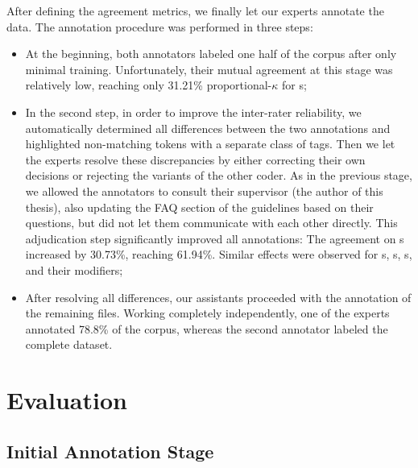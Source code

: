 After defining the agreement metrics, we finally let our experts
annotate the data.  The annotation procedure was performed in three
steps:
\begin{itemize}
  \item At the beginning, both annotators labeled one half of the
    corpus after only minimal training.  Unfortunately, their mutual
    agreement at this stage was relatively low, reaching only 31.21\%
    proportional-$\kappa$ for s;
  \item In the second step, in order to improve the inter-rater
    reliability, we automatically determined all differences between
    the two annotations and highlighted non-matching tokens with a
    separate class of tags.  Then we let the experts resolve these
    discrepancies by either correcting their own decisions or
    rejecting the variants of the other coder.  As in the previous
    stage, we allowed the annotators to consult their supervisor (the
    author of this thesis), also updating the FAQ section of the
    guidelines based on their questions, but did not let them
    communicate with each other directly.  This adjudication step
    significantly improved all annotations: The agreement on
    s increased by 30.73\%, reaching 61.94\%.
    Similar effects were observed for s,
    s, s, and their modifiers;
  \item After resolving all differences, our assistants proceeded with
    the annotation of the remaining files.  Working completely
    independently, one of the experts annotated 78.8\% of the corpus,
    whereas the second annotator labeled the complete dataset.
\end{itemize}

\section{Evaluation}\label{sec:eval}

\subsection{Initial Annotation Stage}\label{subsec:eval-initial-stage}

